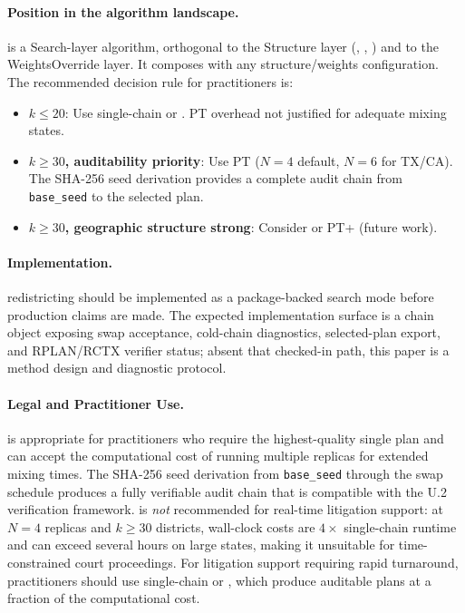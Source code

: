 \paragraph{Position in the algorithm landscape.}
\pt{} is a Search-layer algorithm, orthogonal to the Structure layer
(\geosec{}, \ar{}, \sa{}) and to the WeightsOverride layer.
It composes with any structure/weights configuration.
The recommended decision rule for practitioners is:
\begin{itemize}
\item \textbf{$k \le 20$}: Use single-chain \fr{} or \cs{}. PT overhead not
  justified for adequate mixing states.
\item \textbf{$k \ge 30$, auditability priority}: Use PT ($N=4$ default,
  $N=6$ for TX/CA).
  The SHA-256 seed derivation provides a complete audit chain from
  \texttt{base\_seed} to the selected plan.
\item \textbf{$k \ge 30$, geographic structure strong}: Consider \ms{} or
  PT+\ms{} (future work).
\end{itemize}

\paragraph{Implementation.}
\pt{} redistricting should be implemented as a package-backed search mode
before production claims are made.  The expected implementation surface is a
chain object exposing swap acceptance, cold-chain diagnostics, selected-plan
export, and RPLAN/RCTX verifier status; absent that checked-in path, this paper
is a method design and diagnostic protocol.

\paragraph{Legal and Practitioner Use.}
\pt{} is appropriate for practitioners who require the highest-quality single
plan and can accept the computational cost of running multiple replicas for
extended mixing times.
The SHA-256 seed derivation from \texttt{base\_seed} through the swap schedule
produces a fully verifiable audit chain that is compatible with the U.2
verification framework.
\pt{} is \emph{not} recommended for real-time litigation support: at $N=4$
replicas and $k \geq 30$ districts, wall-clock costs are $4\times$ single-chain
runtime and can exceed several hours on large states, making it unsuitable for
time-constrained court proceedings.
For litigation support requiring rapid turnaround, practitioners should use
single-chain \fr{} or \cs{}, which produce auditable plans at a fraction of
the computational cost.

